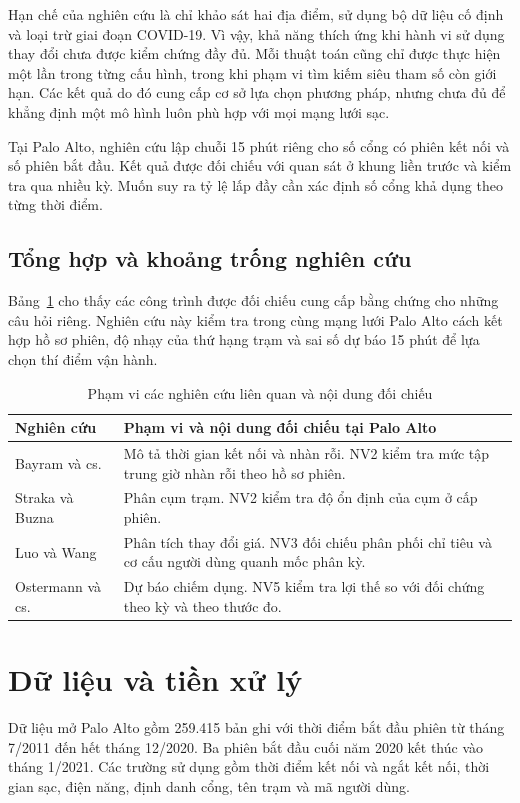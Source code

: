 \documentclass[conference,a4paper]{IEEEtran}
\begin{document}
Hạn chế của nghiên cứu là chỉ khảo sát hai địa điểm, sử dụng bộ dữ liệu cố định và loại trừ giai đoạn COVID-19. Vì vậy, khả năng thích ứng khi hành vi sử dụng thay đổi chưa được kiểm chứng đầy đủ. Mỗi thuật toán cũng chỉ được thực hiện một lần trong từng cấu hình, trong khi phạm vi tìm kiếm siêu tham số còn giới hạn. Các kết quả do đó cung cấp cơ sở lựa chọn phương pháp, nhưng chưa đủ để khẳng định một mô hình luôn phù hợp với mọi mạng lưới sạc.

Tại Palo Alto, nghiên cứu lập chuỗi 15 phút riêng cho số cổng có phiên kết nối và số phiên bắt đầu. Kết quả được đối chiếu với quan sát ở khung liền trước và kiểm tra qua nhiều kỳ. Muốn suy ra tỷ lệ lấp đầy cần xác định số cổng khả dụng theo từng thời điểm.

\subsection{Tổng hợp và khoảng trống nghiên cứu}
Bảng~\ref{tab:related_work} cho thấy các công trình được đối chiếu cung cấp bằng chứng cho những câu hỏi riêng. Nghiên cứu này kiểm tra trong cùng mạng lưới Palo Alto cách kết hợp hồ sơ phiên, độ nhạy của thứ hạng trạm và sai số dự báo 15 phút để lựa chọn thí điểm vận hành.

\begin{table}[!t]
\caption{Phạm vi các nghiên cứu liên quan và nội dung đối chiếu}
\label{tab:related_work}
\centering\footnotesize
\setlength{\tabcolsep}{3pt}
\begin{tabularx}{\columnwidth}{@{}p{}X@{}}
\toprule
\textbf{Nghiên cứu} & \textbf{Phạm vi và nội dung đối chiếu tại Palo Alto} \\
\midrule
Bayram và cs.~\cite{bayram2023} & Mô tả thời gian kết nối và nhàn rỗi. NV2 kiểm tra mức tập trung giờ nhàn rỗi theo hồ sơ phiên. \\
Straka và Buzna~\cite{straka2019} & Phân cụm trạm. NV2 kiểm tra độ ổn định của cụm ở cấp phiên. \\
Luo và Wang~\cite{luowang2025} & Phân tích thay đổi giá. NV3 đối chiếu phân phối chỉ tiêu và cơ cấu người dùng quanh mốc phân kỳ. \\
Ostermann và cs.~\cite{ostermann2022} & Dự báo chiếm dụng. NV5 kiểm tra lợi thế so với đối chứng theo kỳ và theo thước đo. \\
\bottomrule
\end{tabularx}
\end{table}

\section{Dữ liệu và tiền xử lý}
Dữ liệu mở Palo Alto \cite{paloalto2021} gồm 259.415 bản ghi với thời điểm bắt đầu phiên từ tháng 7/2011 đến hết tháng 12/2020. Ba phiên bắt đầu cuối năm 2020 kết thúc vào tháng 1/2021. Các trường sử dụng gồm thời điểm kết nối và ngắt kết nối, thời gian sạc, điện năng, định danh cổng, tên trạm và mã người dùng.
\end{document}
